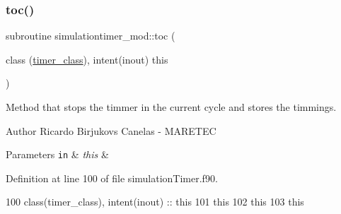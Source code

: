 \subsubsection{\texorpdfstring{toc()}{toc()}}
{\footnotesize\ttfamily subroutine simulationtimer\+\_\+mod\+::toc (\begin{DoxyParamCaption}\item[{class (\mbox{\hyperlink{structsimulationtimer__mod_1_1timer__class}{timer\+\_\+class}}), intent(inout)}]{this }\end{DoxyParamCaption})\hspace{0.3cm}{\ttfamily [private]}}



Method that stops the timmer in the current cycle and stores the timmings. 

\begin{DoxyAuthor}{Author}
Ricardo Birjukovs Canelas -\/ M\+A\+R\+E\+T\+EC 
\end{DoxyAuthor}

\begin{DoxyParams}[1]{Parameters}
\mbox{\tt in}  & {\em this} & \\
\hline
\end{DoxyParams}


Definition at line 100 of file simulation\+Timer.\+f90.


\begin{DoxyCode}
100     class(timer\_class), \textcolor{keywordtype}{intent(inout)} :: this
101     this%
102     this%
103     this%
\end{DoxyCode}
